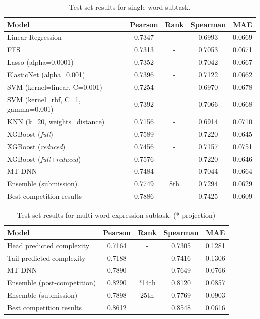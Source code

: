 \documentclass[11pt,a4paper]{article}
\begin{document}
\begin{table}[t]
  \centering
  \begin{tabular}{lcccc}
  \hline \textbf{Model} & \textbf{Pearson} & \textbf{Rank} & \textbf{Spearman} & \textbf{MAE} \\ \hline
  Linear Regression	& 0.7347 & - &	0.6993 &	0.0669 \\
  FFS	& 0.7313 & - &	0.7053 & 0.0671 \\
  Lasso (alpha=0.0001) &	0.7352 & - &	0.7042 & 	0.0667 \\
  ElasticNet (alpha=0.001) &	0.7396 & - &	0.7122 &	0.0662 \\
  SVM (kernel=linear, C=0.001) &	0.7254 & - &	0.6970 &	0.0678 \\
  SVM (kernel=rbf, C=1, gamma=0.001) &	0.7392 & - &	0.7066 &	0.0668 \\
  KNN (k=20, weights=distance) &	0.7156 & -	& 0.6914 &	0.0710 \\
  \hline
  XGBoost (\textit{full}) &	0.7589 & - &	0.7220 &	0.0645 \\
  XGBoost (\textit{reduced}) &	0.7456 & - &	0.7157 &	0.0751 \\
  XGBoost (\textit{full}+\textit{reduced}) & 0.7576 & - & 0.7220 & 0.0646 \\
  MT-DNN & 0.7484 & -	& 0.7044 & 0.0664 \\
  Ensemble (submission) & 0.7749 & 8th & 0.7294 & 0.0629 \\
  \hline
  Best competition results & 0.7886 & & 0.7425 & 0.0609 \\ 
  \hline
  \end{tabular}
  \caption{\label{single-word-results-table} Test set results for single word subtask. }
\end{table}

\begin{table}[t]
  \centering
  \begin{tabular}{lcccc}
  \hline \textbf{Model} & \textbf{Pearson} & \textbf{Rank} & \textbf{Spearman} & \textbf{MAE} \\ \hline
  Head predicted complexity & 0.7164 & - & 0.7305 & 0.1281 \\
  Tail predicted complexity & 0.7188 & - & 0.7416 & 0.1306 \\
  MT-DNN & 0.7890 & - & 0.7649 & 0.0766 \\
  Ensemble (post-competition) & 0.8290 & *14th & 0.8120 & 0.0857 \\
  Ensemble (submission) & 0.7898 & 25th & 0.7769 & 0.0903 \\
  \hline
  Best competition results & 0.8612 & &  0.8548 & 0.0616 \\ 
  \hline
  \end{tabular}
  \caption{\label{multi-word-results-table} Test set results for multi-word expression subtask. (* projection)}
\end{table}
\end{document}
